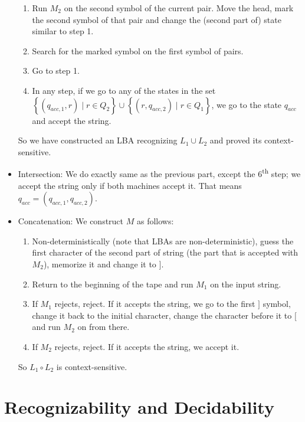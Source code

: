 \documentclass{article}
\begin{document}
\begin{itemize}
\begin{enumerate}
\item Run \(M_2\) on the second symbol of the current pair. Move the head, mark the second symbol of that pair and change the (second part of) state similar to step 1.
\item Search for the marked symbol on the first symbol of pairs.
\item Go to step 1.
\item In any step, if we go to any of the states in the set \(\left\{(q_{acc, 1}, r)\mid r \in Q_2\right\} \cup \left\{(r, q_{acc, 2})\mid r \in Q_1\right\}\), we 
go to the state \(q_{acc}\) and accept the string.
\end{enumerate}

So we have constructed an LBA recognizing \(L_1 \cup L_2\) and proved its context-sensitive.

\item Intersection: We do exactly same as the previous part, except the 6\textsuperscript{th} step; we accept the string only if both machines accept it. That means \(q_{acc} = (q_{acc, 1}, q_{acc, 2})\).

\item Concatenation: We construct \(M\) as follows:
\begin{enumerate}
\item Non-deterministically (note that LBAs are non-deterministic), guess the first character of the second part of string (the part that is accepted with \(M_2\)), memorize it and change it to \(]\).
\item Return to the beginning of the tape and run \(M_1\) on the input string.
\item If \(M_1\) rejects, reject. If it accepts the string, we go to the first \(]\) symbol, change it back to the initial character, change the character before it to \([\) and run \(M_2\) on from there.
\item If \(M_2\) rejects, reject. If it accepts the string, we accept it.
\end{enumerate}
So \(L_1 \circ L_2\) is context-sensitive.
\end{itemize}

\section{Recognizability and Decidability}
\end{document}

